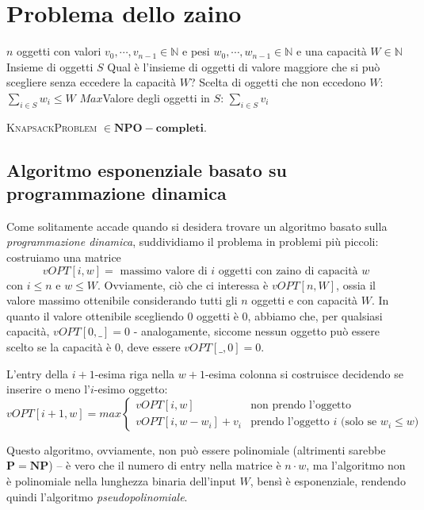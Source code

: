 \section{Problema dello zaino}
 {$n$ oggetti con valori $v_0, \cdots, v_{n-1} \in \mathbb{N}$ e
	pesi $w_0, \cdots, w_{n-1} \in \mathbb{N}$ e una capacità $W \in \mathbb{N}$} {Insieme di oggetti $S$}
{Qual è l'insieme di oggetti di valore maggiore che si può scegliere senza eccedere
	la capacità $W$?}
{Scelta di oggetti che non eccedono $W$: $\sum_{i \in S} w_i \leq W$}
{$Max$}{Valore degli oggetti in $S$: $\sum_{i \in S} v_i$}

\begin{theorem}
	\textsc{KnapsackProblem} $\in \mathbf{NPO-completi}$.
\end{theorem}

\subsection{Algoritmo esponenziale basato su programmazione dinamica}
Come solitamente accade quando si desidera trovare un algoritmo basato
sulla \textit{programmazione dinamica}, suddividiamo il problema in problemi
più piccoli: costruiamo una matrice
$$
	vOPT[i, w] =  \text{ massimo valore di } i \text{ oggetti con zaino di capacità } w
$$
con $ i \leq n$ e $w \leq W$. Ovviamente, ciò che ci interessa è $vOPT[n, W]$,
ossia il valore massimo ottenibile considerando tutti gli $n$ oggetti
e con capacità $W$.
In quanto il valore ottenibile scegliendo $0$ oggetti è $0$, abbiamo che, per qualsiasi
capacità, $vOPT[0, \_] = 0$ - analogamente, siccome nessun oggetto può essere scelto
se la capacità è $0$, deve essere $vOPT[\_, 0]  = 0$.

L'entry della $i+1$-esima riga nella $w+1$-esima colonna
si costruisce decidendo se inserire o meno l'$i$-esimo oggetto:
$$
	vOPT[i+1, w] = max
	\begin{cases}
		vOPT[i, w]             & \text{non prendo l'oggetto} \\
		vOPT[i, w - w_i] + v_i & \text{prendo l'oggetto } i \text{ (solo se } w_i \leq w \text{)}
	\end{cases}
$$

Questo algoritmo, ovviamente, non può essere polinomiale (altrimenti sarebbe
$\mathbf{P} = \mathbf{NP}$) -- è vero che il
numero di entry nella matrice è $n \cdot w$, ma l'algoritmo non è polinomiale nella
lunghezza binaria dell'input $W$, bensì è esponenziale, rendendo quindi l'algoritmo
\textit{pseudopolinomiale}.

